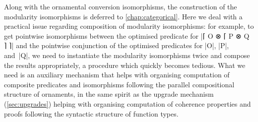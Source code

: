 Along with the ornamental conversion isomorphisms, the construction of the modularity isomorphisms is deferred to \autoref{chap:categorical}.
Here we deal with a practical issue regarding composition of modularity isomorphisms:
for example, to get pointwise isomorphisms between the optimised predicate for |⌈ O ⊗ ⌈ P ⊗ Q ⌉ ⌉| and the pointwise conjunction of the optimised predicates for |O|, |P|, and~|Q|, we need to instantiate the modularity isomorphisms twice and compose the results appropriately, a procedure which quickly becomes tedious.
What we need is an auxiliary mechanism that helps with organising computation of composite predicates and isomorphisms following the parallel compositional structure of ornaments, in the same spirit as the upgrade mechanism (\autoref{sec:upgrades}) helping with organising computation of coherence properties and proofs following the syntactic structure of function types.

